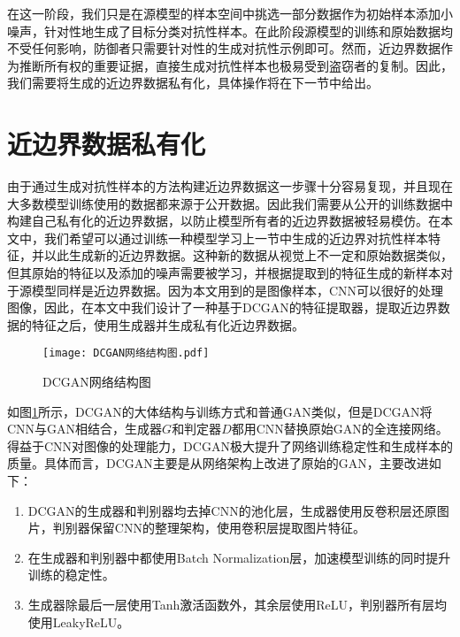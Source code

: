 在这一阶段，我们只是在源模型的样本空间中挑选一部分数据作为初始样本添加小噪声，针对性地生成了目标分类对抗性样本。在此阶段源模型的训练和原始数据均不受任何影响，防御者只需要针对性的生成对抗性示例即可。然而，近边界数据作为推断所有权的重要证据，直接生成对抗性样本也极易受到盗窃者的复制。因此，我们需要将生成的近边界数据私有化，具体操作将在下一节中给出。

\section{近边界数据私有化}\label{3.3}

由于通过生成对抗性样本的方法构建近边界数据这一步骤十分容易复现，并且现在大多数模型训练使用的数据都来源于公开数据。因此我们需要从公开的训练数据中构建自己私有化的近边界数据，以防止模型所有者的近边界数据被轻易模仿。在本文中，我们希望可以通过训练一种模型学习上一节中生成的近边界对抗性样本特征，并以此生成新的近边界数据。这种新的数据从视觉上不一定和原始数据类似，但其原始的特征以及添加的噪声需要被学习，并根据提取到的特征生成的新样本对于源模型同样是近边界数据。因为本文用到的是图像样本，CNN可以很好的处理图像，因此，在本文中我们设计了一种基于DCGAN\cite{radford2015unsupervised}的特征提取器，提取近边界数据的特征之后，使用生成器并生成私有化近边界数据。

\begin{figure}[htbp]%
	\centering
	\texttt{[image: DCGAN网络结构图.pdf]}
	\setlength{\abovecaptionskip}{5mm} %
	\caption{DCGAN网络结构图}
	\label{DCGAN网络结构图}
\end {figure}

如图\ref{DCGAN网络结构图}所示，DCGAN的大体结构与训练方式和普通GAN类似，但是DCGAN将CNN与GAN相结合，生成器$G$和判定器$D$都用CNN替换原始GAN的全连接网络。得益于CNN对图像的处理能力，DCGAN极大提升了网络训练稳定性和生成样本的质量。具体而言，DCGAN主要是从网络架构上改进了原始的GAN，主要改进如下：

\begin{enumerate}
	\renewcommand{\labelenumi}{\theenumi)}
	\item DCGAN的生成器和判别器均去掉CNN的池化层，生成器使用反卷积层还原图片，判别器保留CNN的整理架构，使用卷积层提取图片特征。
	\item 在生成器和判别器中都使用Batch Normalization层，加速模型训练的同时提升训练的稳定性。
	\item 生成器除最后一层使用Tanh激活函数外，其余层使用ReLU，判别器所有层均使用LeakyReLU。
\end{enumerate}

